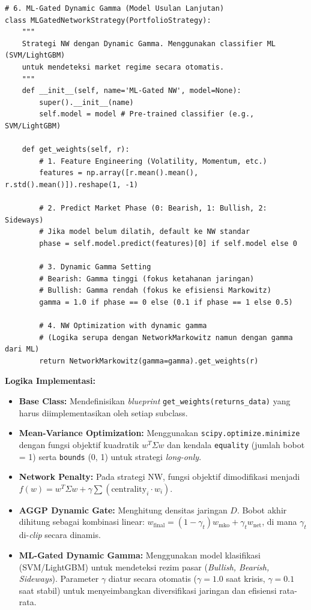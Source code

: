 \documentclass[12pt, a4paper]{article}
\begin{document}
\begin{lstlisting}
# 6. ML-Gated Dynamic Gamma (Model Usulan Lanjutan)
class MLGatedNetworkStrategy(PortfolioStrategy):
    """
    Strategi NW dengan Dynamic Gamma. Menggunakan classifier ML (SVM/LightGBM)
    untuk mendeteksi market regime secara otomatis.
    """
    def __init__(self, name='ML-Gated NW', model=None):
        super().__init__(name)
        self.model = model # Pre-trained classifier (e.g., SVM/LightGBM)

    def get_weights(self, r):
        # 1. Feature Engineering (Volatility, Momentum, etc.)
        features = np.array([r.mean().mean(), r.std().mean()]).reshape(1, -1)
        
        # 2. Predict Market Phase (0: Bearish, 1: Bullish, 2: Sideways)
        # Jika model belum dilatih, default ke NW standar
        phase = self.model.predict(features)[0] if self.model else 0
        
        # 3. Dynamic Gamma Setting
        # Bearish: Gamma tinggi (fokus ketahanan jaringan)
        # Bullish: Gamma rendah (fokus ke efisiensi Markowitz)
        gamma = 1.0 if phase == 0 else (0.1 if phase == 1 else 0.5)
        
        # 4. NW Optimization with dynamic gamma
        # (Logika serupa dengan NetworkMarkowitz namun dengan gamma dari ML)
        return NetworkMarkowitz(gamma=gamma).get_weights(r)
\end{lstlisting}
\textbf{Logika Implementasi:}
\begin{itemize}
    \item \textbf{Base Class:} Mendefinisikan \textit{blueprint} \texttt{get\_weights(returns\_data)} yang harus diimplementasikan oleh setiap subclass.
    \item \textbf{Mean-Variance Optimization:} Menggunakan \texttt{scipy.optimize.minimize} dengan fungsi objektif kuadratik $w^T \Sigma w$ dan kendala \texttt{equality} (jumlah bobot = 1) serta \texttt{bounds} (0, 1) untuk strategi \textit{long-only}.
    \item \textbf{Network Penalty:} Pada strategi NW, fungsi objektif dimodifikasi menjadi $f(w) = w^T \Sigma w + \gamma \sum (\text{centrality}_i \cdot w_i)$.
    \item \textbf{AGGP Dynamic Gate:} Menghitung densitas jaringan $D$. Bobot akhir dihitung sebagai kombinasi linear: $w_{\text{final}} = (1 - \gamma_t) w_{\text{mko}} + \gamma_t w_{\text{net}}$, di mana $\gamma_t$ di-\textit{clip} secara dinamis.
    \item \textbf{ML-Gated Dynamic Gamma:} Menggunakan model klasifikasi (SVM/LightGBM) untuk mendeteksi rezim pasar (\textit{Bullish, Bearish, Sideways}). Parameter $\gamma$ diatur secara otomatis ($\gamma=1.0$ saat krisis, $\gamma=0.1$ saat stabil) untuk menyeimbangkan diversifikasi jaringan dan efisiensi rata-rata.
\end{itemize}
\end{document}
